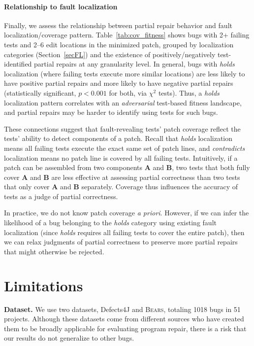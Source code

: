 \documentclass[10pt, conference]{IEEEtran}
\newcommand\bears{\textsc{Bears}\xspace}
\begin{document}
\paragraph{Relationship to fault localization} 
Finally, we assess the relationship between partial repair behavior and fault
localization/coverage pattern. Table~\ref{tab:cov_fitness} shows 
bugs with 2+ failing tests 
and 2--6 edit locations in the minimized patch, grouped by localization
categories (Section~\ref{secFL})
and the existence of positively/negatively
test-identified partial repairs at any granularity level.
In general, bugs with \emph{holds} localization (where failing tests execute
more similar locations) are less likely to have
positive partial repairs and more likely to have negative partial repairs (statistically significant,
$p < 0.001$ for both, via $\chi^2$ tests).
Thus, a \emph{holds} localization pattern correlates with an
\emph{adversarial} test-based fitness landscape,
and partial repairs may be harder to identify using tests for such bugs. 

These connections 
suggest that fault-revealing tests' patch coverage reflect the tests' ability
to detect components of a patch.
Recall that \emph{holds} localization means all failing tests execute 
the exact same set of patch lines, and \emph{contradicts} localization 
means no patch line is covered by all failing tests.
Intuitively, if a patch can be
assembled from two components \textbf{A} and \textbf{B}, two tests that both
fully cover \textbf{A} and \textbf{B} are less effective at assessing partial
correctness than two tests that only cover \textbf{A} and \textbf{B} separately.
Coverage thus influences the accuracy of tests as a judge of partial correctness.

In practice, we do not know patch coverage \emph{a priori}.  However, if we can infer the
likelihood of a bug belonging to the \emph{holds} category using existing 
fault localization (since \emph{holds} requires all failing tests to cover the 
entire patch), then we can relax judgments of partial correctness to 
preserve more partial repairs that might otherwise be rejected.

\section{Limitations}

\label{sec:limits}
\noindent\textbf{Dataset.}
We use two datasets, Defects4J and \bears, totaling 1018 bugs in 51 projects. 
Although these datasets come from different sources who have created them to be broadly 
applicable for evaluating program repair, there is a risk that our results do not generalize to other 
bugs.
\end{document}
